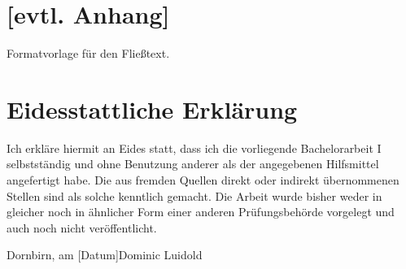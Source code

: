 \documentclass[a4paper,12pt,twoside]{scrreprt}
\begin{document}
\chapter*{[evtl. Anhang]} %
Formatvorlage für den Fließtext.

\chapter*{Eidesstattliche Erklärung}
Ich erkläre hiermit an Eides statt, dass ich die vorliegende Bachelorarbeit I selbstständig und ohne Benutzung anderer als der angegebenen Hilfsmittel angefertigt habe. Die aus fremden Quellen direkt oder indirekt übernommenen Stellen sind als solche kenntlich gemacht. Die Arbeit wurde bisher weder in gleicher noch in ähnlicher Form einer anderen Prüfungsbehörde vorgelegt und auch noch nicht veröffentlicht.

\vspace{3cm}
\noindent
Dornbirn, am [Datum]\hfill Dominic Luidold
\end{document}
